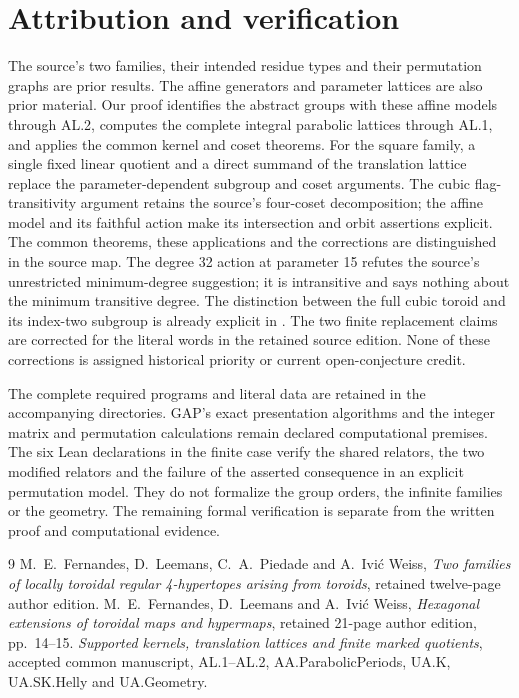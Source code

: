 \documentclass[11pt,a4paper]{article}
\begin{document}
\section{Attribution and verification}
The source's two families, their intended residue types and their
permutation graphs are prior results. The affine generators and parameter lattices are also prior material.
Our proof identifies the abstract groups with these affine models through
AL.2, computes the complete integral parabolic lattices through AL.1,
and applies the common kernel and coset theorems. For the square family,
a single fixed linear quotient and a direct summand of the translation
lattice replace the parameter-dependent subgroup and coset arguments.
The cubic flag-transitivity argument retains the source's four-coset
decomposition; the affine model and its faithful action make its
intersection and orbit assertions explicit. The common theorems,
these applications and the corrections are distinguished in the source map. The degree 32 action at
parameter 15 refutes the source's unrestricted minimum-degree suggestion;
it is intransitive and says nothing about the minimum transitive degree.
The distinction between the full cubic toroid and its index-two subgroup
is already explicit in \cite{earlier}. The two finite replacement claims
are corrected for the literal words in the retained source edition.
None of these corrections is assigned historical priority or current
open-conjecture credit.

The complete required programs and literal data are retained in the
accompanying directories. GAP's exact presentation algorithms and the
integer matrix and permutation calculations remain declared computational
premises. The six Lean declarations in the finite case verify the shared
relators, the two modified relators and the failure of the asserted
consequence in an explicit permutation model. They do not formalize the
group orders, the infinite families or the geometry. The remaining formal
verification is separate from the written proof and computational evidence.

\begin{thebibliography}{9}
 M.~E.~Fernandes, D.~Leemans, C.~A.~Piedade and
A.~Ivi\'c Weiss, \emph{Two families of locally toroidal regular
4-hypertopes arising from toroids}, retained twelve-page author edition.
 M.~E.~Fernandes, D.~Leemans and A.~Ivi\'c Weiss,
\emph{Hexagonal extensions of toroidal maps and hypermaps}, retained
21-page author edition, pp.~14--15.
 \emph{Supported kernels, translation lattices and finite
marked quotients}, accepted common manuscript, AL.1--AL.2,
AA.ParabolicPeriods, UA.K, UA.SK.Helly and UA.Geometry.
\end{thebibliography}
\end{document}
